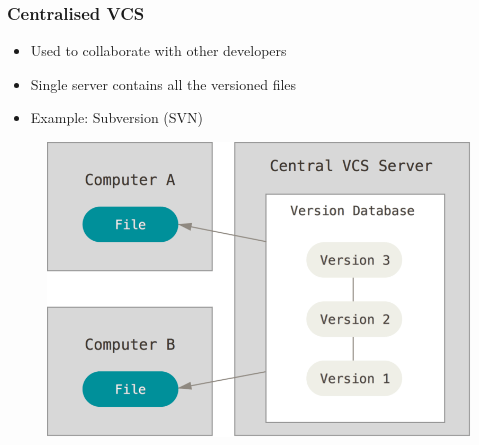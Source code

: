 \documentclass{beamer}
\begin{document}
\begin{frame}
	\frametitle{Centralised VCS}
	\begin{itemize}
		\item{Used to collaborate with other developers}
		\item{Single server contains all the versioned files}
		\item{Example: Subversion (SVN)}
	\end{itemize}
	\begin{figure}
		\includegraphics[scale=0.25]{Centralised_VCS-0.png}
	\end{figure}

\end{frame}
\end{document}
